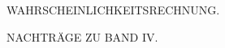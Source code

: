 \thispagestyle{empty}
\vspace*{.27\textheight}
\begin{center}
{\Large WAHRSCHEINLICHKEITSRECHNUNG.}\par\bigskip
NACHTRÄGE ZU BAND IV.
\end{center}
\clearpage

